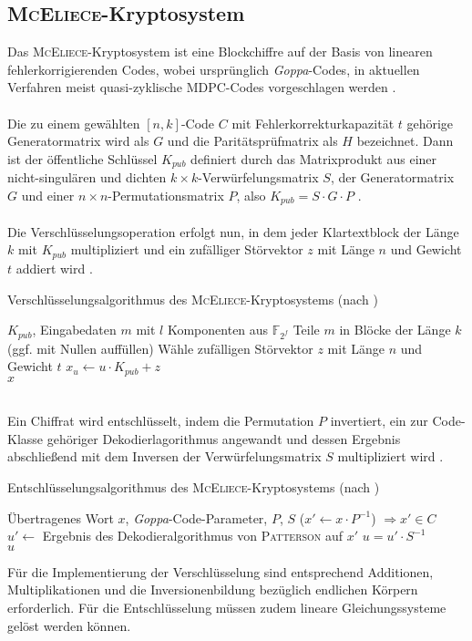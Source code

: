 \documentclass[utf8, biblatex]{lni}
\begin{document}
\subsection{\textsc{McEliece}-Kryptosystem}
Das \textsc{McEliece}-Kryptosystem ist eine Blockchiffre auf der Basis von linearen fehlerkorrigierenden Codes, wobei ursprünglich \textit{Goppa}-Codes, in aktuellen Verfahren meist quasi-zyklische MDPC-Codes vorgeschlagen werden \cite{McEliece1978} \cite{Misoczki2013}. \\\\
Die zu einem gewählten $[n, k]$-Code $C$ mit Fehlerkorrekturkapazität $t$ gehörige Generatormatrix wird als $G$ und die Paritätsprüfmatrix als $H$ bezeichnet. Dann ist der öffentliche Schlüssel $K_{pub}$ definiert durch das Matrixprodukt aus einer nicht-singulären und dichten $k \times k$-Verwürfelungsmatrix $S$, der Generatormatrix $G$ und einer $n \times n$-Permutationsmatrix $P$, also $K_{pub} = S \cdot G \cdot P$ \cite[S. 114]{McEliece1978}. \\\\
Die Verschlüsselungsoperation erfolgt nun, in dem jeder Klartextblock der Länge $k$ mit $K_{pub}$ multipliziert und ein zufälliger Störvektor $z$ mit Länge $n$ und Gewicht $t$ addiert wird \cite{McEliece1978}. 
\begin{algorithm}[h!]
\caption{Verschlüsselungsalgorithmus des \textsc{McEliece}-Kryptosystems (nach \parencite{McEliece1978})} \label{McElieceEnc}
\begin{algorithmic}[1]
\Require $K_{pub}$, Eingabedaten $m$ mit $l$ Komponenten aus $\mathbb{F}_{2^f}$
\State Teile $m$ in Blöcke der Länge $k$ (ggf. mit Nullen auffüllen)
	\State Wähle zufälligen Störvektor $z$ mit Länge $n$ und Gewicht $t$
	\State $x_u \gets u \cdot K_{pub} + z$
\EndFor \\
\Return $x$
\end{algorithmic}
\end{algorithm}\\
Ein Chiffrat wird entschlüsselt, indem die Permutation $P$ invertiert, ein zur Code-Klasse gehöriger Dekodierlagorithmus angewandt und dessen Ergebnis abschließend mit dem Inversen der Verwürfelungsmatrix $S$ multipliziert wird \cite{McEliece1978}.
\begin{algorithm}[h!]
\caption{Entschlüsselungsalgorithmus des \textsc{McEliece}-Kryptosystems (nach \parencite{McEliece1978})}
\begin{algorithmic}[1]
\Require Übertragenes Wort $x$, \textit{Goppa}-Code-Parameter, $P$, $S$
\State ($x' \gets x \cdot P^{-1}$) $\Rightarrow x' \in C$
\State $u' \gets $ Ergebnis des Dekodieralgorithmus von \textsc{Patterson} auf $x'$
\State $u = u' \cdot S^{-1}$ \\
\Return $u$
\end{algorithmic}
\end{algorithm}
Für die Implementierung der Verschlüsselung sind entsprechend Additionen, Multiplikationen und die Inversionenbildung bezüglich endlichen Körpern erforderlich. Für die Entschlüsselung müssen zudem lineare Gleichungssysteme gelöst werden können.
\end{document}
